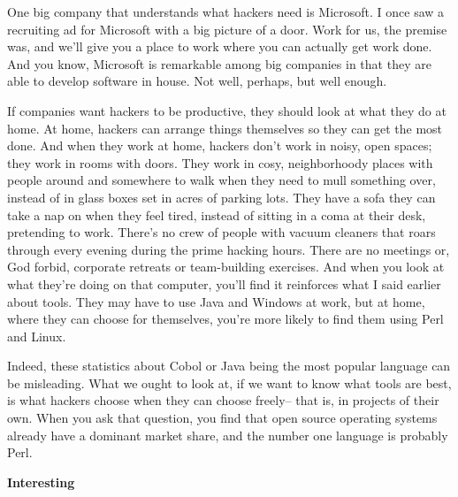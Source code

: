One big company
                    that understands what hackers need is Microsoft. I once saw
                    a recruiting ad for Microsoft with a big picture of a door.
                    Work for us, the premise was, and we'll give you a place to
                    work where you can actually get work done. And you know,
                    Microsoft is remarkable among big companies in that they are
                    able to develop software in house. Not well, perhaps, but
                    well enough.

If companies want hackers to be
                    productive, they should look at what they do at home. At
                    home, hackers can arrange things themselves so they can get
                    the most done. And when they work at home, hackers don't
                    work in noisy, open spaces; they work in rooms with doors.
                    They work in cosy, neighborhoody places with people around
                    and somewhere to walk when they need to mull something over,
                    instead of in glass boxes set in acres of parking lots. They
                    have a sofa they can take a nap on when they feel tired,
                    instead of sitting in a coma at their desk, pretending to
                    work. There's no crew of people with vacuum cleaners that
                    roars through every evening during the prime hacking hours.
                    There are no meetings or, God forbid, corporate retreats or
                    team-building exercises. And when you look at what they're
                    doing on that computer, you'll find it reinforces what I
                    said earlier about tools. They may have to use Java and
                    Windows at work, but at home, where they can choose for
                    themselves, you're more likely to find them using Perl and
                    Linux.

Indeed, these statistics about Cobol or
                    Java being the most popular language can be misleading. What
                    we ought to look at, if we want to know what tools are best,
                    is what hackers choose when they can choose freely-- that
                    is, in projects of their own. When you ask that question,
                    you find that open source operating systems already have a
                    dominant market share, and the number one language is
                    probably Perl.

\textbf{Interesting}

